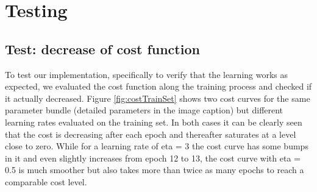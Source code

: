 \section{Testing}
\subsection{Test: decrease of cost function}
To test our implementation, specifically to verify that the learning works as expected, we evaluated the cost function along the training process and checked if it actually decreased. Figure \ref{fig:costTrainSet} shows two cost curves for the same parameter bundle (detailed parameters in the image caption) but different learning rates evaluated on the training set. In both cases it can be clearly seen that the cost is decreasing after each epoch and thereafter saturates at a level close to zero. While for a learning rate of eta = 3 the cost curve has some bumps in it and even slightly increases from epoch 12 to 13, the cost curve with eta = 0.5 is much smoother but also takes more than twice as many epochs to reach a comparable cost level. 
